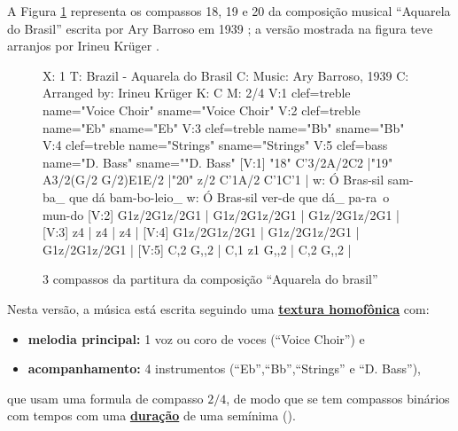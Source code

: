A Figura \ref{fig:abc-caquarela} representa os compassos 18, 19 e 20 da  
composição musical ``Aquarela do Brasil'' escrita
por Ary Barroso em 1939 \cite{AquarelaDoBrasil}; 
a versão mostrada na figura teve arranjos por Irineu Krüger \cite{Irineu}. 
\begin{figure}[ht]
\centering
\begin{abc}[name=abc-caquarela]%
%
X: 1 %
T: Brazil - Aquarela do Brasil
C: Music: Ary Barroso, 1939
C: Arranged by: Irineu Krüger
K: C %
M: 2/4 %
%
V:1 clef=treble name="Voice Choir" sname="Voice Choir"
V:2 clef=treble name="Eb" sname="Eb"
V:3 clef=treble name="Bb" sname="Bb"
V:4 clef=treble name="Strings" sname="Strings"
V:5 clef=bass   name="D. Bass" sname=""D. Bass"
%
%
[V:1] "18" C'3/2A/2C2  |"19" A3/2(G/2 G/2)E1E/2  |"20" z/2 C'1A/2 C'1C'1  |
w:    Ó Bras-sil        sam-ba_ que dá       bam-bo-leio_ 
w:    Ó Bras-sil        ver-de que dá_       pa-ra~o mun-do 
%
%
[V:2] G1z/2G1z/2G1  | G1z/2G1z/2G1  | G1z/2G1z/2G1  |
%
%
[V:3] z4  | z4  | z4  |
%
%
[V:4] G1z/2G1z/2G1  | G1z/2G1z/2G1  | G1z/2G1z/2G1  |
%
%
[V:5] C,2 G,,2  | C,1 z1 G,,2  | C,2 G,,2  |
\end{abc}
\caption{3 compassos da partitura da composição ``Aquarela do brasil''}
\label{fig:abc-caquarela}
\end{figure}
Nesta versão, a música está escrita seguindo uma 
\hyperref[subsec:homofonica]{\textbf{textura homofônica}} com:
\begin{itemize}
\item \textbf{melodia principal:} 1 voz ou coro de voces (``Voice Choir'') e  
\item \textbf{acompanhamento:} 4 instrumentos (``Eb'',``Bb'',``Strings'' e ``D. Bass''), 
\end{itemize}
que usam uma 
formula de compasso $2/4$, de modo que se tem compassos
binários com tempos com uma \hyperref[sec:pos:Duracion]{\textbf{duração}} de uma semínima (\quarternote).

